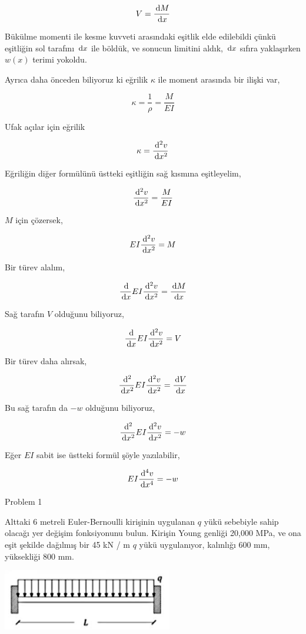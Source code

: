 \documentclass[12pt,fleqn]{article}\usepackage{../../common}
\begin{document}
$$
V = \frac{\,\mathrm{d} M}{\,\mathrm{d} x}
$$

Bükülme momenti ile kesme kuvveti arasındaki eşitlik elde edilebildi çünkü
eşitliğin sol tarafını $\,\mathrm{d} x$ ile böldük, ve sonucun limitini aldık, $\,\mathrm{d} x$
sıfıra yaklaşırken $w(x)$ terimi yokoldu.

Ayrıca daha önceden biliyoruz ki eğrilik $\kappa$ ile moment arasında
bir ilişki var,

$$
\kappa = \frac{1}{\rho} = \frac{M}{EI}
$$

Ufak açılar için eğrilik

$$
\kappa = \frac{\,\mathrm{d}^2 v}{\,\mathrm{d} x^2}
$$

Eğriliğin diğer formülünü üstteki eşitliğin sağ kısmına eşitleyelim,

$$
\frac{\,\mathrm{d}^2 v}{\,\mathrm{d} x^2} = \frac{M}{EI}
$$

$M$ için çözersek,

$$
EI \frac{\,\mathrm{d}^2 v}{\,\mathrm{d} x^2} = M
$$

Bir türev alalım,

$$
\frac{\,\mathrm{d} }{\,\mathrm{d} x} EI \frac{\,\mathrm{d}^2 v}{\,\mathrm{d} x^2} = \frac{\,\mathrm{d} M}{\,\mathrm{d} x}
$$

Sağ tarafın $V$ olduğunu biliyoruz,

$$
\frac{\,\mathrm{d} }{\,\mathrm{d} x} EI \frac{\,\mathrm{d}^2 v}{\,\mathrm{d} x^2} = V
$$

Bir türev daha alırsak,

$$
\frac{\,\mathrm{d}^2 }{\,\mathrm{d} x^2} EI \frac{\,\mathrm{d}^2 v}{\,\mathrm{d} x^2} = \frac{\,\mathrm{d} V}{\,\mathrm{d} x}
$$

Bu sağ tarafın da $-w$ olduğunu biliyoruz,

$$
\frac{\,\mathrm{d}^2 }{\,\mathrm{d} x^2} EI \frac{\,\mathrm{d}^2 v}{\,\mathrm{d} x^2} = -w
$$

Eğer $EI$ sabit ise üstteki formül şöyle yazılabilir,
        
$$
EI \frac{\,\mathrm{d}^4 v}{\,\mathrm{d} x^4} = -w
$$

Problem 1

Alttaki 6 metreli Euler-Bernoulli kirişinin uygulanan $q$ yükü sebebiyle sahip
olacağı yer değişim fonksiyonunu bulun. Kirişin Young genliği 20,000 MPa, ve ona
eşit şekilde dağılmış bir 45 kN / m $q$ yükü uygulanıyor, kalınlığı 600 mm,
yüksekliği 800 mm.

\includegraphics[width=20em]{phy_020_strs_03_02.jpg}
\end{document}
